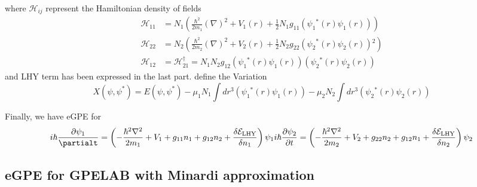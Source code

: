 where $\mathcal{H}_{ij}$ represent the Hamiltonian density of fields
\begin{equation}
\begin{split}
\mathcal{H}_{11}&=N_1\left(\frac{\hbar ^2}{2m_1}(\nabla )^2+V_1(r)+\frac{1}{2}N_1g_{11}\left(\psi _1{}^*(r)\psi _1(r)\right)\right)\\
\mathcal{H}_{22}&=N_2\left(\frac{\hbar ^2}{2m_2}(\nabla )^2+V_2(r)+\frac{1}{2}N_2g_{22}\left(\psi _2{}^*(r)\psi _2(r)\right){}^2\right)\\
\mathcal{H}_{12}&=\mathcal{H}_{21}^{\dagger }=N_1N_2g_{12}\left(\psi _1{}^*(r)\psi _1(r)\right)\left(\psi _2{}^*(r)\psi _2(r)\right)
\end{split}
\end{equation}
and LHY term has been expressed in the last part.
define the Variation
\begin{equation}
X\left(\psi ,\psi ^*\right)=E\left(\psi ,\psi ^*\right)-\mu _1 N_1\int dr^3\left(\psi _1{}^*(r)\psi _1(r)\right)-\mu _2 N_2\int dr^3\left(\psi
_2{}^*(r)\psi _2(r)\right)
\end{equation}

Finally, we have eGPE for 
\begin{equation}
i \hbar \frac{\partial\psi_1}{\partialt}=\left(-\frac{\hbar^2\nabla^2}{2m_1}+V_1+g_{11}n_1+g_{12}n_2+\frac{\delta  \mathcal{E}_{\text{LHY}}}{\delta n_1}\right)\psi _1\\
i \hbar \frac{\partial \psi _2}{\partial t}=\left(-\frac{\hbar ^2\nabla ^2}{2m_2}+V_2+g_{22}n_2+g_{12}n_1+\frac{\delta  \mathcal{E}_{\text{LHY}}}{\delta n_2}\right)\psi _2
\end{equation}

\subsection*{eGPE for GPELAB with Minardi approximation}

